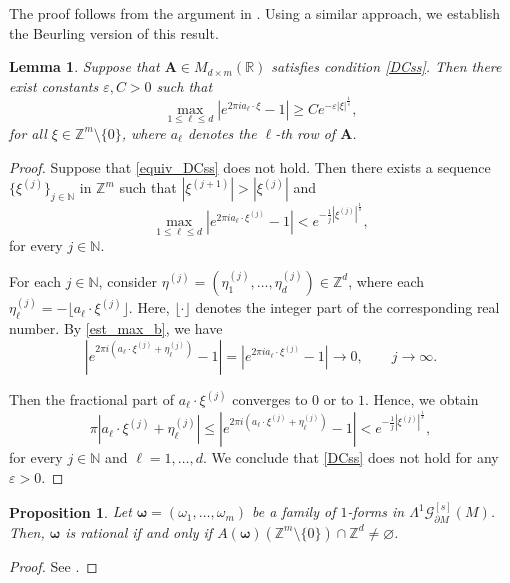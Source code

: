 \documentclass[11pt,reqno]{amsart}
\numberwithin{equation}{section}
\newtheorem{lemma}[theorem]{Lemma}
\newtheorem{proposition}[theorem]{Proposition}
\begin{document}
	The proof follows from the argument in \cite[Lemma~8.1]{DM2020}. 
	Using a similar approach, we establish the Beurling version of this result.
		
	\begin{lemma}\label{est_DCss}
		Suppose that $\boldsymbol{A}\in M_{d\times m}(\mathbb{R})$ satisfies condition \eqref{DCss}. Then there exist constants $\varepsilon,C>0$ such that
		\begin{equation}\label{equiv_DCss}
			\max_{1\leq\ell\leq d}\left|e^{2\pi i a_\ell\cdot\xi}-1\right|\geq C e^{-\varepsilon|\xi|^{\frac{1}{s}}},
		\end{equation}
		for all $\xi\in\mathbb{Z}^m\setminus\{0\}$, where $a_\ell$ denotes the $\ell$-th row of $\boldsymbol{A}$.
	\end{lemma}
	
	\begin{proof}
		Suppose that \eqref{equiv_DCss} does not hold. Then there exists a sequence $\{\xi^{(j)}\}_{j\in\mathbb{N}}$ in $\mathbb{Z}^m$ such that $|\xi^{(j+1)}|>|\xi^{(j)}|$ and
		\begin{equation}\label{est_max_b} 
			\max_{1\leq\ell\leq d}\left|e^{2\pi i a_\ell\cdot\xi^{(j)}}-1\right|<e^{-\frac{1}{j}|\xi^{(j)}|^{\frac{1}{s}}},
		\end{equation}
		for every $j\in\mathbb{N}$.
		
		For each $j\in\mathbb{N}$, consider $\eta^{(j)} = (\eta^{(j)}_1,\dots,\eta^{(j)}_d)\in\mathbb{Z}^d$, where each $\eta^{(j)}_{\ell}=-\lfloor a_\ell\cdot\xi^{(j)} \rfloor$. Here, $\lfloor \cdot \rfloor$ denotes the integer part of the corresponding real number. By \eqref{est_max_b}, we have
		\[
		\left|e^{2\pi i (a_\ell\cdot \xi^{(j)} + \eta^{(j)}_{\ell})}-1\right|
		=
		\left|e^{2\pi i a_\ell\cdot \xi^{(j)}}-1\right|
		\to 0,
		\qquad j\to \infty.
		\]
		
		Then the fractional part of $a_\ell\cdot\xi^{(j)}$ converges to $0$ or to $1$. Hence, we obtain
		\[
		\pi\left|a_\ell\cdot\xi^{(j)}+\eta^{(j)}_{\ell}\right|
		\leq 
		\left|e^{2\pi i(a_\ell\cdot\xi^{(j)}+\eta^{(j)}_{\ell})}-1\right|
		<
		e^{-\frac{1}{j}|\xi^{(j)}|^{\frac{1}{s}}},
		\]
		for every $j\in\mathbb{N}$ and $\ell=1,\dots,d$. We conclude that \eqref{DCss} does not hold for any $\varepsilon>0$.
	\end{proof}
	
	
	\begin{proposition}
			Let $\boldsymbol{\omega}=(\omega_1,\dots,\omega_m)$ be a family of $1$-forms in 
			$\mathsf{\Lambda}^1\mathscr{G}^{[s]}_{\partial M}(M)$. Then, $\boldsymbol{\omega}$ is rational if and only if 
			$A(\boldsymbol{\omega})(\mathbb{Z}^m\setminus\{0\})\cap\mathbb{Z}^d\neq\varnothing$.
	\end{proposition}
	\begin{proof}
		See \cite[Proposition 3.8 (i)]{CKMT}.
	\end{proof}
	
\end{document}

